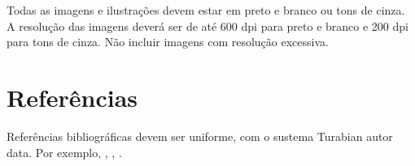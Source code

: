 \documentclass[12pt]{article}
\begin{document}
Todas as imagens e ilustrações devem estar em preto e branco ou tons
de cinza. A resolução das imagens deverá ser de até 600 dpi para preto
e branco e 200 dpi para tons de cinza. Não incluir imagens com
resolução excessiva.

\section{Referências}

Referências bibliográficas devem ser uniforme, com o sustema Turabian
autor data. Por exemplo, \cite{kroger04:desenvolvendo},
\cite{babbitt61:set}\cite{coutinho.ea05:computational},
\cite{morris87:composition}.



\end{document}
